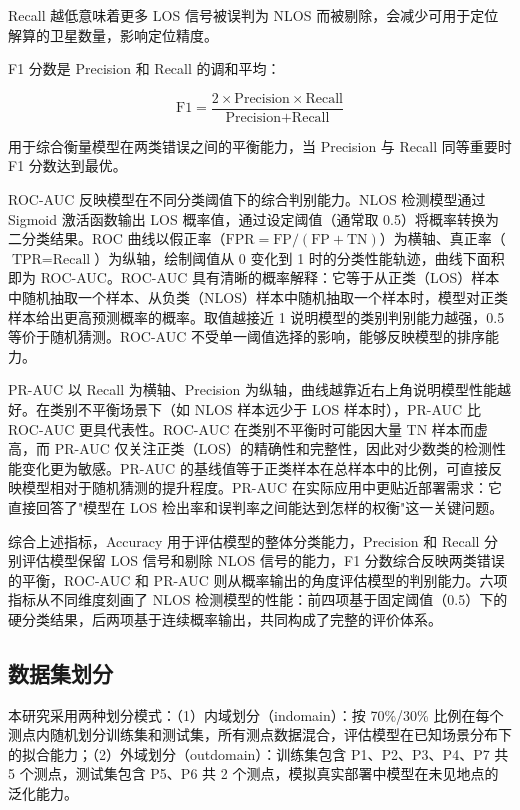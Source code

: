 Recall 越低意味着更多 LOS 信号被误判为 NLOS 而被剔除，会减少可用于定位解算的卫星数量，影响定位精度。

F1 分数是 Precision 和 Recall 的调和平均：

\begin{equation}
\text{F1} = \dfrac{2 \times \text{Precision} \times \text{Recall}}{\text{Precision} + \text{Recall}}
\end{equation}

用于综合衡量模型在两类错误之间的平衡能力，当 Precision 与 Recall 同等重要时 F1 分数达到最优。

ROC-AUC 反映模型在不同分类阈值下的综合判别能力。NLOS 检测模型通过 Sigmoid 激活函数输出 LOS 概率值，通过设定阈值（通常取 0.5）将概率转换为二分类结果。ROC 曲线以假正率（$\text{FPR} = \text{FP}/(\text{FP}+\text{TN})$）为横轴、真正率（$\text{TPR} = \text{Recall}$）为纵轴，绘制阈值从 0 变化到 1 时的分类性能轨迹，曲线下面积即为 ROC-AUC。ROC-AUC 具有清晰的概率解释：它等于从正类（LOS）样本中随机抽取一个样本、从负类（NLOS）样本中随机抽取一个样本时，模型对正类样本给出更高预测概率的概率。取值越接近 1 说明模型的类别判别能力越强，0.5 等价于随机猜测。ROC-AUC 不受单一阈值选择的影响，能够反映模型的排序能力。

PR-AUC 以 Recall 为横轴、Precision 为纵轴，曲线越靠近右上角说明模型性能越好。在类别不平衡场景下（如 NLOS 样本远少于 LOS 样本时），PR-AUC 比 ROC-AUC 更具代表性。ROC-AUC 在类别不平衡时可能因大量 TN 样本而虚高，而 PR-AUC 仅关注正类（LOS）的精确性和完整性，因此对少数类的检测性能变化更为敏感。PR-AUC 的基线值等于正类样本在总样本中的比例，可直接反映模型相对于随机猜测的提升程度。PR-AUC 在实际应用中更贴近部署需求：它直接回答了"模型在 LOS 检出率和误判率之间能达到怎样的权衡"这一关键问题。

综合上述指标，Accuracy 用于评估模型的整体分类能力，Precision 和 Recall 分别评估模型保留 LOS 信号和剔除 NLOS 信号的能力，F1 分数综合反映两类错误的平衡，ROC-AUC 和 PR-AUC 则从概率输出的角度评估模型的判别能力。六项指标从不同维度刻画了 NLOS 检测模型的性能：前四项基于固定阈值（0.5）下的硬分类结果，后两项基于连续概率输出，共同构成了完整的评价体系。

\subsection{数据集划分}

本研究采用两种划分模式：（1）内域划分（indomain）：按 70\%/30\% 比例在每个测点内随机划分训练集和测试集，所有测点数据混合，评估模型在已知场景分布下的拟合能力；（2）外域划分（outdomain）：训练集包含 P1、P2、P3、P4、P7 共 5 个测点，测试集包含 P5、P6 共 2 个测点，模拟真实部署中模型在未见地点的泛化能力。

